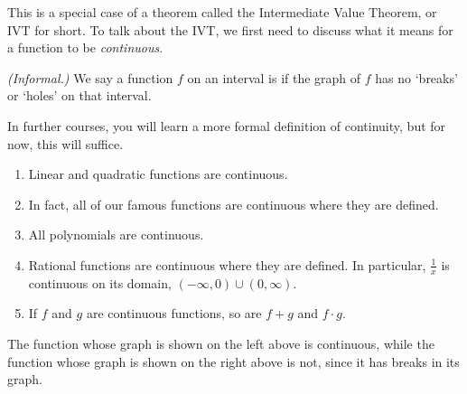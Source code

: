 \documentclass[noauthor, nooutcomes]{ximera}
\begin{document}
This is a special case of a theorem called the Intermediate Value Theorem, or IVT for short. To talk about the IVT, we first need to discuss what it means for a function to be \emph{continuous}. 

\begin{definition}\emph{(Informal.)}
We say a function $f$ on an interval is  if the graph of $f$ has no `breaks' or `holes' on that interval. 
\end{definition}

In further courses, you will learn a more formal definition of continuity, but for now, this will suffice.

\begin{example}
\begin{enumerate}
	\item Linear and quadratic functions are continuous.
	\item In fact, all of our famous functions are continuous where they are defined. 
	\item All polynomials are continuous.
	\item Rational functions are continuous where they are defined. In particular, $\frac{1}{x}$ is continuous on its domain, $(- \infty, 0) \cup (0, \infty)$. 
	\item If $f$ and $g$ are continuous functions, so are $f + g$ and $f \cdot g$. 
\end{enumerate}
\end{example}

\begin{image}
\hspace{10mm}
\end{image}
The function whose graph is shown on the left above is continuous, while the function whose graph is shown on the right above is not, since it has breaks in its graph.
\end{document}
